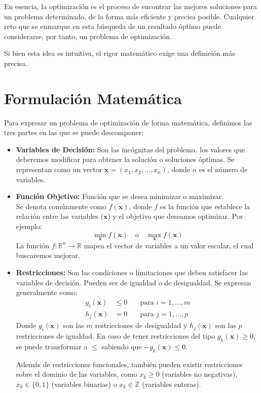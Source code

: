 \documentclass[12pt,a4paper]{book}
\begin{document}
En esencia, la optimización es el proceso de encontrar las mejores soluciones para un problema determinado, de la forma más eficiente y precisa posible.
Cualquier reto que se enmarque en esta búsqueda de un resultado óptimo puede considerarse, por tanto, un problema de optimización.

Si bien esta idea es intuitiva, el rigor matemático exige una definición más precisa.

\section{Formulación Matemática}

Para expresar un problema de optimización de forma matemática, definimos las tres partes en las que se puede descomponer:

\begin{itemize}
    \item \textbf{Variables de Decisión:} Son las incógnitas del problema, los valores que deberemos modificar para obtener la solución o soluciones óptimas. Se representan como un vector $\mathbf{x} = (x_1, x_2, \ldots, x_n)$, donde $n$ es el número de variables.

    \item \textbf{Función Objetivo:} Función que se desea minimizar o maximizar.\\
    Se denota comúnmente como $f(\mathbf{x})$, donde $f$ es la función que establece la relación entre las variables ($\mathbf{x}$) y el objetivo que deseamos optimizar.
    Por ejemplo:
    $$ \min_{\mathbf{x}} f(\mathbf{x}) \quad \text{o} \quad \max_{\mathbf{x}} f(\mathbf{x}) $$
    La función $f: \mathbb{R}^n \to \mathbb{R}$ mapea el vector de variables a un valor escalar, el cual buscaremos mejorar.

    \item \textbf{Restricciones:} Son las condiciones o limitaciones que deben satisfacer las variables de decisión. Pueden ser de igualdad o de desigualdad. Se expresan generalmente como:
    \begin{align*}
        g_i(\mathbf{x}) &\le 0 & \quad \text{para } i = 1, \ldots, m \\
        h_j(\mathbf{x}) &= 0 & \quad \text{para } j = 1, \ldots, p
    \end{align*}
    Donde $g_i(\mathbf{x})$ son las $m$ restricciones de desigualdad y $h_j(\mathbf{x})$ son las $p$ restricciones de igualdad.
    En caso de tener restricciones del tipo $g_k(\mathbf{x})\geq0$, se puede transformar a $\leq$ sabiendo que $-g_k(\mathbf{x}) \leq 0$.
    
    Además de restricciones funcionales, también pueden existir restricciones sobre el dominio de las variables, como $x_k \ge 0$ (variables no negativas),  $x_k \in \{0,1\}$ (variables binarias) o $x_k \in \mathbb{Z}$ (variables enteras).
\end{itemize}
\end{document}
